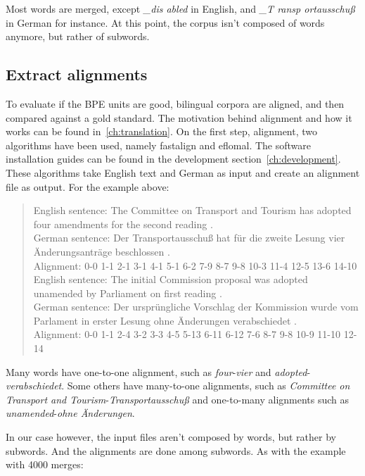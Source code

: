 Most words are merged, except \emph{\_dis abled} in English, and \emph{\_T ransp ortausschuß} in German for instance. At this point, the corpus isn't composed of words anymore, but rather of subwords.

\subsection{Extract alignments}\label{subsec:extractalign}

To evaluate if the BPE units are good, bilingual corpora are aligned, and then compared against a gold standard. The motivation behind alignment and how it works can be found in~\ref{ch:translation}. On the first step, alignment, two algorithms have been used, namely fastalign and eflomal. The software installation guides can be found in the development section~\ref{ch:development}. These algorithms take English text and German as input and create an alignment file as output. For the example above:

\begin{quote}
	English sentence: The Committee on Transport and Tourism has adopted four amendments for the second reading .\\
	German sentence: Der Transportausschuß hat für die zweite Lesung vier Änderungsanträge beschlossen .\\
	Alignment: 0-0 1-1 2-1 3-1 4-1 5-1 6-2 7-9 8-7 9-8 10-3 11-4 12-5 13-6 14-10\\

	English sentence: The initial Commission proposal was adopted unamended by Parliament on first reading .\\
	German sentence: Der ursprüngliche Vorschlag der Kommission wurde vom Parlament in erster Lesung ohne Änderungen verabschiedet .\\
	Alignment: 0-0 1-1 2-4 3-2 3-3 4-5 5-13 6-11 6-12 7-6 8-7 9-8 10-9 11-10 12-14
\end{quote}

Many words have one-to-one alignment, such as \emph{four}-\emph{vier} and \emph{adopted}-\emph{verabschiedet}. Some others have many-to-one alignments, such as \emph{Committee on Transport and Tourism}-\emph{Transportausschuß} and one-to-many alignments such as \emph{unamended}-\emph{ohne Änderungen}.

In our case however, the input files aren't composed by words, but rather by subwords. And the alignments are done among subwords. As with the example with 4000 merges:

